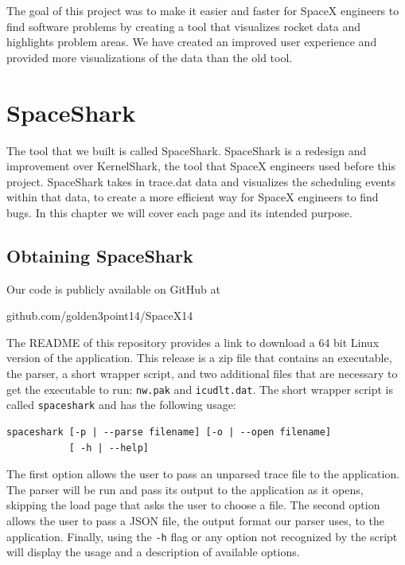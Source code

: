 \documentclass{hmcclinic}
\begin{document}
The goal of this project was to make it easier and faster for SpaceX engineers
to find software problems by creating a tool that visualizes rocket data and
highlights problem areas. We have created an improved user experience and
provided more visualizations of the data than the old tool. 
\chapter{SpaceShark}

The tool that we built is called SpaceShark. SpaceShark is a redesign and
improvement over KernelShark, the tool that SpaceX engineers used before this
project. SpaceShark takes in trace.dat data and visualizes the scheduling events
within that data, to create a more efficient way for SpaceX engineers to find
bugs. In this chapter we will cover each page and its intended purpose.

\section{Obtaining SpaceShark}
  Our code is publicly available on GitHub at
\begin{center}
  github.com/golden3point14/SpaceX14
\end{center}
The README of this repository provides a link to download a
  64 bit Linux version of the application. This release is a zip file that
  contains an executable, the parser, a short wrapper script, and two additional
  files that are necessary to get the executable to run: \texttt{nw.pak} and
  \texttt{icudlt.dat}.
  The short wrapper script is called \texttt{spaceshark} and has the following usage:

\begin{verbatim}spaceshark [-p | --parse filename] [-o | --open filename] 
           [ -h | --help]\end{verbatim}

  The first option allows the user to pass an unparsed trace file to the
  application. The parser will be run and pass its output 
  to the application as it opens, skipping the load page that asks the
  user to choose a file. The second option allows the user to pass a
  JSON file, the output format our parser uses, to the application. Finally, using the \texttt{-h} flag or any option
  not recognized by the script will display the usage and a description of
  available options.
\end{document}
